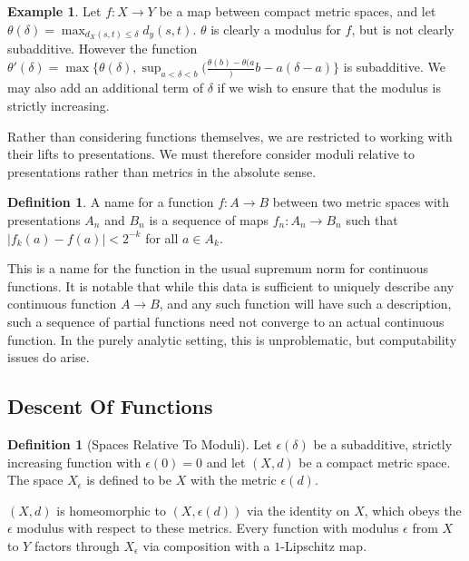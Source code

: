\documentclass{journal}
\theoremstyle{definition}
\newtheorem{dfn}[thm]{Definition}
\newtheorem{example}[thm]{Example}
\begin{document}
\begin{example}
    Let $f:X\rightarrow Y$ be a map between compact metric spaces, and let $\theta(\delta) = \max_{d_X(s,t)\leq\delta}d_y(s,t)$. $\theta$ is clearly a modulus for $f$, but is not clearly subadditive. However the function $\theta'(\delta) = \max\{\theta(\delta), \sup_{a<\delta < b}(\frac{\theta(b)-\theta(a}){b-a}(\delta-a)\}$ is subadditive. We may also add an additional term of $\delta$ if we wish to ensure that the modulus is strictly increasing.
\end{example}
\label{example:empirical]}
Rather than considering functions themselves, we are restricted to working with their lifts to presentations. We must therefore consider moduli relative to presentations rather than metrics in the absolute sense.

\begin{dfn}
    A name for a function $f:A\rightarrow B$ between two metric spaces with presentations $A_n$ and $B_n$ is a sequence of maps $f_n:A_n\rightarrow B_n$ such that $|f_k(a) -f(a)| < 2^{-k}$ for all $a \in A_k$.
\end{dfn}
\label{dfn:funcname}

This is a name for the function in the usual supremum norm for continuous functions. It is notable that while this data is sufficient to uniquely describe any continuous function $A\rightarrow B$, and any such function will have such a description, such a sequence of partial functions need not converge to an actual continuous function. In the purely analytic setting, this is unproblematic, but computability issues do arise.

\subsection{Descent Of Functions}
\label{sec:descent}
\begin{dfn}[Spaces Relative To Moduli]
Let $\epsilon(\delta)$ be a subadditive, strictly increasing function with $\epsilon(0) = 0$ and let $(X,d)$ be a compact metric space. The space $X_\epsilon$ is defined to be $X$ with the metric $\epsilon(d)$. 
\end{dfn}
\label{dfn:relativespaces}

$(X,d)$ is homeomorphic to $(X,\epsilon(d))$ via the identity on $X$, which obeys the $\epsilon$ modulus with respect to these metrics. Every function with modulus $\epsilon$ from $X$ to $Y$ factors through $X_\epsilon$ via composition with a $1$-Lipschitz map.
\end{document}
